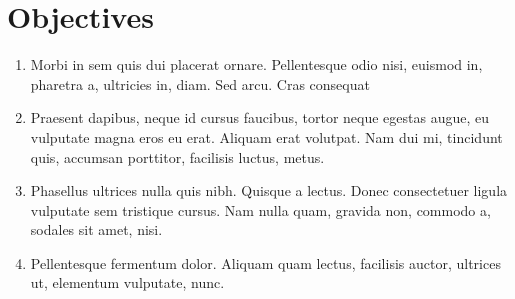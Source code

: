 \section{Objectives}

\begin{enumerate}
    \item Morbi in sem quis dui placerat ornare. Pellentesque odio nisi, euismod in, pharetra a, ultricies in, diam. Sed arcu. Cras consequat
    \item Praesent dapibus, neque id cursus faucibus, tortor neque egestas augue, eu vulputate magna eros eu erat. Aliquam erat volutpat. Nam dui mi, tincidunt quis, accumsan porttitor, facilisis luctus, metus.
    \item Phasellus ultrices nulla quis nibh. Quisque a lectus. Donec consectetuer ligula vulputate sem tristique cursus. Nam nulla quam, gravida non, commodo a, sodales sit amet, nisi.
    \item Pellentesque fermentum dolor. Aliquam quam lectus, facilisis auctor, ultrices ut, elementum vulputate, nunc.
\end{enumerate}
